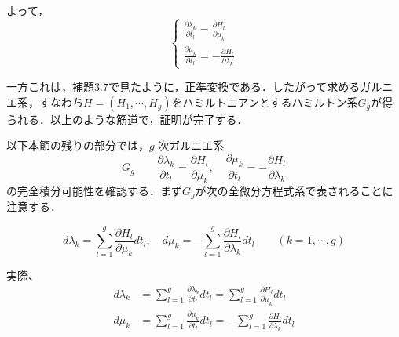\documentclass[paper=a4, fontsize=11pt]{jlreq} %
\newenvironment{story}{%
  \begin{mdframed}[
    backgroundcolor=red!5, %
    linewidth=0pt,         %
    innertopmargin=10pt,   %
    innerbottommargin=10pt,
    innerrightmargin=10pt, %
    innerleftmargin=10pt
  ]%
}{%
  \end{mdframed}%
}
\theoremstyle{break}
\theoremstyle{qa}
\begin{document}
よって，
\[
\begin{cases}
    \displaystyle \frac{\partial \lambda_k}{\partial t_l} = \frac{\partial H_l}{\partial \mu_k} \\
    \displaystyle \frac{\partial \mu_k}{\partial t_l} = - \frac{\partial H_l}{\partial \lambda_k}
\end{cases}
\]
\begin{story}
一方これは，補題3.7で見たように，正準変換である．したがって求めるガルニエ系，すなわち$H=(H_1, \cdots, H_g)$をハミルトニアンとするハミルトン系$G_g$が得られる．以上のような筋道で，証明が完了する．

以下本節の残りの部分では，$g$-次ガルニエ系
\begin{equation*}
    G_g \qquad \frac{\partial \lambda_k}{\partial t_l} = \frac{\partial H_l}{\partial \mu_k}, \quad \frac{\partial \mu_k}{\partial t_l} = - \frac{\partial H_l}{\partial \lambda_k}
\end{equation*}
の完全積分可能性を確認する．まず$G_g$が次の全微分方程式系で表されることに注意する．

\begin{equation}
    d\lambda_k = \sum_{l=1}^g \frac{\partial H_l}{\partial \mu_k} dt_l, \quad d\mu_k = - \sum_{l=1}^g \frac{\partial H_l}{\partial \lambda_k} dt_l \qquad (k=1, \cdots, g) \tag{3.94}
\end{equation}

\end{story}
実際、
\begin{align*}
    d\lambda_k &= \sum_{l=1}^g \frac{\partial \lambda_k}{\partial t_l} dt_l = \sum_{l=1}^g \frac{\partial H_l}{\partial \mu_k} dt_l \\
    d\mu_k &= \sum_{l=1}^g \frac{\partial \mu_k}{\partial t_l} dt_l = -\sum_{l=1}^g \frac{\partial H_l}{\partial \lambda_k} dt_l
\end{align*}
\end{document}
